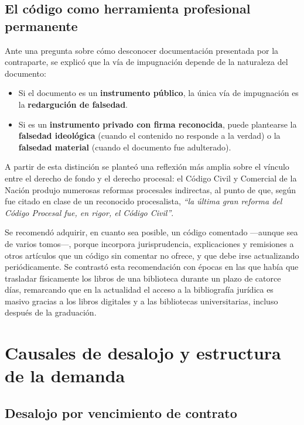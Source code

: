 \documentclass[12pt,oneside]{book}
\begin{document}
\section{El código como herramienta profesional permanente}

Ante una pregunta sobre cómo desconocer documentación presentada por la contraparte, se explicó que la vía de impugnación depende de la naturaleza del documento:

\begin{itemize}
    \item Si el documento es un \textbf{instrumento público}, la única vía de impugnación es la \textbf{redargución de falsedad}.
    \item Si es un \textbf{instrumento privado con firma reconocida}, puede plantearse la \textbf{falsedad ideológica} (cuando el contenido no responde a la verdad) o la \textbf{falsedad material} (cuando el documento fue adulterado).
\end{itemize}

A partir de esta distinción se planteó una reflexión más amplia sobre el vínculo entre el derecho de fondo y el derecho procesal: el Código Civil y Comercial de la Nación produjo numerosas reformas procesales indirectas, al punto de que, según fue citado en clase de un reconocido procesalista, \textit{``la última gran reforma del Código Procesal fue, en rigor, el Código Civil''}.

\begin{note}
Se recomendó adquirir, en cuanto sea posible, un código comentado ---aunque sea de varios tomos---, porque incorpora jurisprudencia, explicaciones y remisiones a otros artículos que un código sin comentar no ofrece, y que debe irse actualizando periódicamente. Se contrastó esta recomendación con épocas en las que había que trasladar físicamente los libros de una biblioteca durante un plazo de catorce días, remarcando que en la actualidad el acceso a la bibliografía jurídica es masivo gracias a los libros digitales y a las bibliotecas universitarias, incluso después de la graduación.
\end{note}

\chapter{Causales de desalojo y estructura de la demanda}
\label{cap:causales-estructura}

\section{Desalojo por vencimiento de contrato}
\end{document}
